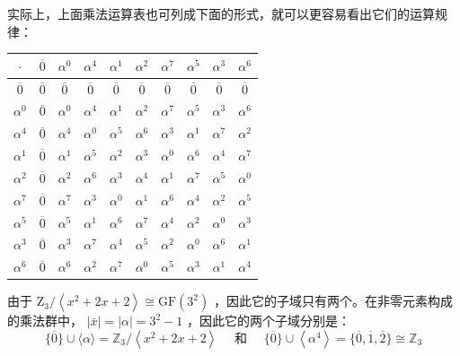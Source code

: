 \documentclass[UTF8, heading=true]{ctexart}
\begin{document}
实际上，上面乘法运算表也可列成下面的形式，就可以更容易看出它们的运算规律：
\vspace{0.5cm}
\begin{table}[H]
  \centering
  \renewcommand{\arraystretch}{1.5}
\begin{tabular}{c||c|c|c|c|c|c|c|c|c}
\hline$\cdot$ & $\overline{0}$ & $\alpha^0$ & $\alpha^4$ & $\alpha^1$ & $\alpha^2$ & $\alpha^7$ & $\alpha^5$ & $\alpha^3$ & $\alpha^6$ \\
\hline$\overline{0}$ & $\overline{0}$ & $\overline{0}$ & $\overline{0}$ & $\overline{0}$ & $\overline{0}$ & $\overline{0}$ & $\overline{0}$ & $\overline{0}$ & $\overline{0}$ \\
$\alpha^0$ & $\overline{0}$ & $\alpha^0$ & $\alpha^4$ & $\alpha^1$ & $\alpha^2$ & $\alpha^7$ & $\alpha^5$ & $\alpha^3$ & $\alpha^6$ \\
$\alpha^4$ & $\overline{0}$ & $\alpha^4$ & $\alpha^0$ & $\alpha^5$ & $\alpha^6$ & $\alpha^3$ & $\alpha^1$ & $\alpha^7$ & $\alpha^2$ \\
$\alpha^1$ & $\overline{0}$ & $\alpha^1$ & $\alpha^5$ & $\alpha^2$ & $\alpha^3$ & $\alpha^0$ & $\alpha^6$ & $\alpha^4$ & $\alpha^7$ \\
$\alpha^2$ & $\overline{0}$ & $\alpha^2$ & $\alpha^6$ & $\alpha^3$ & $\alpha^4$ & $\alpha^1$ & $\alpha^7$ & $\alpha^5$ & $\alpha^0$ \\
$\alpha^7$ & $\overline{0}$ & $\alpha^7$ & $\alpha^3$ & $\alpha^0$ & $\alpha^1$ & $\alpha^6$ & $\alpha^4$ & $\alpha^2$ & $\alpha^5$ \\
$\alpha^5$ & $\overline{0}$ & $\alpha^5$ & $\alpha^1$ & $\alpha^6$ & $\alpha^7$ & $\alpha^4$ & $\alpha^2$ & $\alpha^0$ & $\alpha^3$ \\
$\alpha^3$ & $\overline{0}$ & $\alpha^3$ & $\alpha^7$ & $\alpha^4$ & $\alpha^5$ & $\alpha^2$ & $\alpha^0$ & $\alpha^6$ & $\alpha^1$ \\
$\alpha^6$ & $\overline{0}$ & $\alpha^6$ & $\alpha^2$ & $\alpha^7$ & $\alpha^0$ & $\alpha^5$ & $\alpha^3$ & $\alpha^1$ & $\alpha^4$ \\
\hline
\end{tabular}
\end{table}

\vspace{0.5cm}

由于 $\mathrm{Z}_3 /\left\langle x^2+2 x+2\right\rangle \cong \mathrm{GF}\left(3^2\right)$ ，因此它的子域只有两个。在非零元素构成的乘法群中， $|\bar{x}|=|\alpha|=3^2-1$ ，因此它的两个子域分别是：
$$
\{\overline{0}\} \cup\langle\alpha\rangle=\mathbb{Z}_3 /\left\langle x^2+2 x+2\right\rangle \quad \text { 和 } \quad\{\overline{0}\} \cup\left\langle\alpha^4\right\rangle=\{\overline{0}, \overline{1}, \overline{2}\} \cong \mathbb{Z}_3
$$
\end{document}
